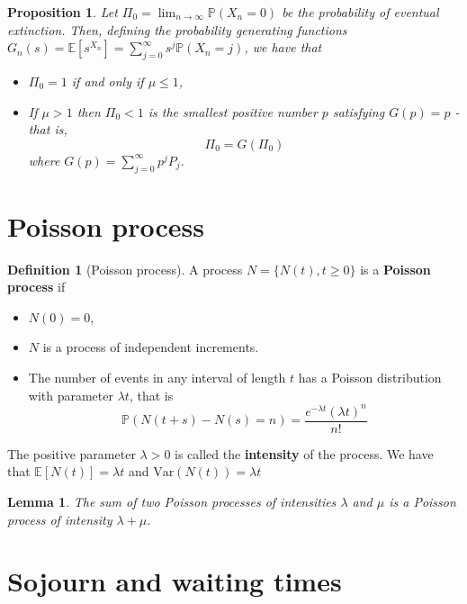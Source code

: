 \documentclass[10pt, oneside, reqno]{amsart}
\theoremstyle{plain}%
\newtheorem{lem}[thm]{Lemma}
\newtheorem{prop}[thm]{Proposition}
\theoremstyle{definition}
\newtheorem{defn}[thm]{Definition}
\theoremstyle{remark}
\newcommand{\expc}[1]{\mathbb{E}\left[#1\right]}
\newcommand{\var}[1]{\text{Var}\left(#1\right)}
\newcommand{\prob}[1]{\mathbb{P}(#1)}
\begin{document}
\begin{prop}
    Let $\Pi_0 = \lim_{n \rightarrow \infty} \prob{X_n = 0}$ be the probability of eventual extinction.  Then, defining the probability generating functions $G_n(s) = \expc{s^{X_n}} = \sum_{j=0}^\infty s^j \prob{X_n = j}$, we have that 
    \begin{itemize}
        \item $\Pi_0 = 1$ if and only if $\mu \leq 1$,
        \item If $\mu > 1$ then $\Pi_0 < 1$ is the smallest positive number $p$ satisfying $G(p) = p$ - that is, \[
            \Pi_0 = G(\Pi_0)
        \] where $G(p) = \sum_{j=0}^\infty p^j P_j$.
    \end{itemize}
\end{prop}



\section{Poisson process} %
\label{sub:poisson_process}
\begin{defn}[Poisson process]
    A process $N = \{N(t), t \geq 0\}$ is a \textbf{Poisson process} if 
    \begin{itemize}
        \item $N(0) = 0$,
        \item $N$ is a process of independent increments.
        \item The number of events in any interval of length $t$ has a Poisson distribution with parameter $\lambda t$, that is \[
            \prob{N(t+s) - N(s) = n}  = \frac{e^{-\lambda t} (\lambda t)^n}{n!}
        \]
    \end{itemize}
    
    The positive parameter $\lambda > 0$ is called the \textbf{intensity} of the process.  We have that $\expc{N(t)} = \lambda t$ and $\var{N(t)} = \lambda t$
\end{defn}

\begin{lem}
    The sum of two Poisson processes of intensities $\lambda$ and $\mu$ is a Poisson process of intensity $\lambda + \mu$.
\end{lem}


\section{Sojourn and waiting times} %
\label{sub:sojourn_and_waiting_times}
\end{document}
